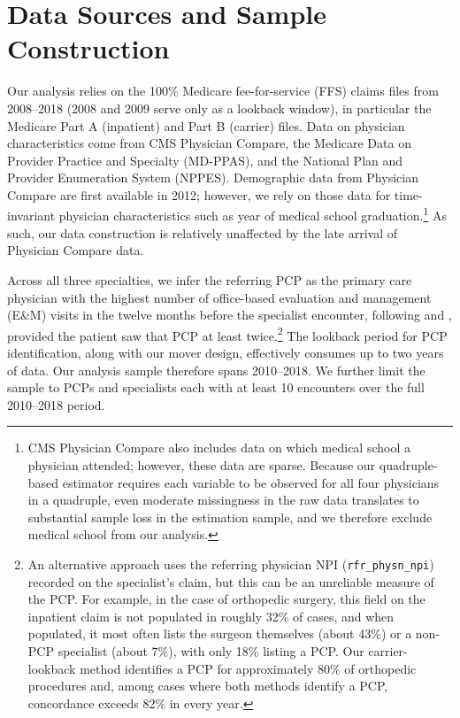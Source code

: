 \documentclass[12pt]{article}
\begin{document}

\section{Data Sources and Sample Construction}
\label{sec:data}

Our analysis relies on the 100\% Medicare fee-for-service (FFS) claims files from 2008--2018 (2008 and 2009 serve only as a lookback window), in particular the Medicare Part A (inpatient) and Part B (carrier) files. Data on physician characteristics come from CMS Physician Compare, the Medicare Data on Provider Practice and Specialty (MD-PPAS), and the National Plan and Provider Enumeration System (NPPES). Demographic data from Physician Compare are first available in 2012; however, we rely on those data for time-invariant physician characteristics such as year of medical school graduation.\footnote{CMS Physician Compare also includes data on which medical school a physician attended; however, these data are sparse. Because our quadruple-based estimator requires each variable to be observed for all four physicians in a quadruple, even moderate missingness in the raw data translates to substantial sample loss in the estimation sample, and we therefore exclude medical school from our analysis.} As such, our data construction is relatively unaffected by the late arrival of Physician Compare data.

Across all three specialties, we infer the referring PCP as the primary care physician with the highest number of office-based evaluation and management (E\&M) visits in the twelve months before the specialist encounter, following \cite{pham2009} and \cite{agha2019}, provided the patient saw that PCP at least twice.\footnote{An alternative approach uses the referring physician NPI (\texttt{rfr\_physn\_npi}) recorded on the specialist's claim, but this can be an unreliable measure of the PCP. For example, in the case of orthopedic surgery, this field on the inpatient claim is not populated in roughly 32\% of cases, and when populated, it most often lists the surgeon themselves (about 43\%) or a non-PCP specialist (about 7\%), with only 18\% listing a PCP. Our carrier-lookback method identifies a PCP for approximately 80\% of orthopedic procedures and, among cases where both methods identify a PCP, concordance exceeds 82\% in every year.} The lookback period for PCP identification, along with our mover design, effectively consumes up to two years of data. Our analysis sample therefore spans 2010--2018. We further limit the sample to PCPs and specialists each with at least 10 encounters over the full 2010--2018 period.
\end{document}
